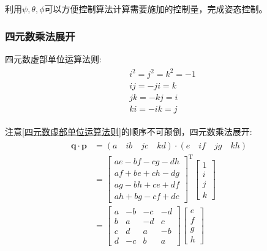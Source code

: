 利用$\psi,\theta,\phi$可以方便控制算法计算需要施加的控制量，完成姿态控制。

\subsubsection{四元数乘法展开}
四元数虚部单位运算法则:
\begin{eqnarray}\label{四元数虚部单位运算法则}
    \begin{split}
        &i^2=j^2=k^2=-1 \\
        &ij=-ji=k \\
        &jk=-kj=i \\
        &ki=-ik=j
    \end{split}
\end{eqnarray} 

注意\ref{四元数虚部单位运算法则}的顺序不可颠倒，四元数乘法展开\citep{捷联惯导航}: 
\begin{eqnarray}\label{四元数乘法展开}
    \begin{split}
        \bm{q}\cdot \bm{p}
        &=(a\quad ib\quad jc\quad kd)\cdot(e\quad if\quad jg\quad kh) \\
        &=\left[\begin{matrix}
        ae-bf-cg-dh \\
        af+be+ch-dg \\
        ag-bh+ce+df \\
        ah+bg-cf+de
        \end{matrix}\right]^\mathrm{T}
        \left[\begin{matrix}
                1 \\ i \\ j \\ k
        \end{matrix}\right] \\
        &=\left[\begin{matrix}
        a &-b &-c &-d \\
        b & a &-d & c \\
        c & d & a &-b \\
        d &-c & b & a
        \end{matrix}\right]
        \left[\begin{matrix} e \\ f \\ g \\ h \end{matrix}\right]
    \end{split}
\end{eqnarray} 

